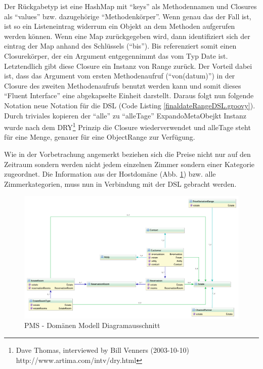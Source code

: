 \documentclass[11pt,english,ngerman, headsepline]{scrreprt}
\begin{document}
Der Rückgabetyp ist eine HashMap mit ``keys'' als Methodennamen und
Closures als ``values'' bzw. dazugehörige ``Methodenkörper''.
Wenn genau das der Fall ist, ist so ein Listeneintrag widerrum ein Objekt an dem
Methoden aufgerufen werden können. Wenn eine Map zurückgegeben wird, dann
identifiziert sich der eintrag der Map anhand des Schlüssels (``bis''). Bis
referenziert somit einen Closurekörper, der ein Argument entgegennimmt das vom
Typ Date ist. Letztendlich gibt diese Closure ein Instanz von Range zurück. Der
Vorteil dabei ist, dass das Argument vom ersten Methodenaufruf (``von(datum)'')
in der Closure des zweiten Methodenaufrufs benutzt werden kann und somit dieses
``Fluent Interface'' eine abgekapselte Einheit darstellt.
Daraus folgt nun folgende Notation neue Notation für die DSL (Code Listing
\ref{finaldateRangeDSL.groovy}).
Durch triviales kopieren der ``alle'' zu ``alleTage'' ExpandoMetaObejkt Instanz
wurde nach dem DRY\footnote{Dave Thomas, interviewed by Bill Venners
(2003-10-10) http://www.artima.com/intv/dry.html} Prinzip die Closure
wiederverwendet und alleTage steht für eine Menge, genauer für eine ObjectRange zur Verfügung.


 
Wie in der Vorbetrachung angemerkt beziehen sich die Preise nicht nur auf den
Zeitraum sondern werden nicht jedem einzelnen Zimmer sondern einer Kategorie
zugeordnet.
Die Information aus der Hostdomäne (Abb. \ref{domainModelDia.png}) bzw. alle
Zimmerkategorien, muss nun in Verbindung mit der DSL gebracht werden.

 
\begin{figure}[h!]
	\begin{center}
	\includegraphics[width=1.3\textwidth,angle=90]{pics/domainModelDia.png}
	\end{center}
	\caption{PMS - Domänen Modell Diagramausschnitt}
	\label{domainModelDia.png}
\end{figure}
\end{document}
